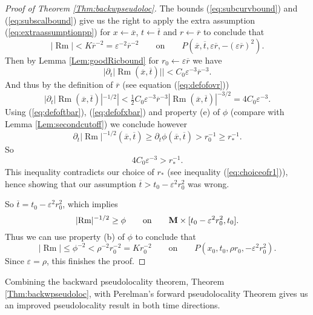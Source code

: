 \documentclass[11pt]{amsart}
\numberwithin{equation}{section}
\def\M{{\bf M}}
\DeclareMathOperator{\Rm}{Rm}
\numberwithin{equation}{section}
\begin{document}
\begin{proof}[Proof of Theorem \ref{Thm:backwpseudoloc}]
The bounds (\ref{eq:subcurvbound}) and (\ref{eq:subscalbound}) give us the right to apply the extra assumption (\ref{eq:extraassumptionpp}) for $x \leftarrow \overline{x}$, $t \leftarrow \overline{t}$ and $r \leftarrow \overline{r}$ to conclude that
\[ |{\Rm}| < K \overline{r}^{-2} = \varepsilon^{-2} \overline{r}^{-2} \qquad \text{on} \qquad P(\overline{x}, \overline{t}, \varepsilon \overline{r}, - (\varepsilon \overline{r})^2). \]
Then by Lemma \ref{Lem:goodRicbound} for $r_0 \leftarrow \varepsilon \overline{r}$ we have
\[ |\partial_t | {\Rm (\overline{x}, \overline{t})}| | < C_0 \varepsilon^{-3} \overline{r}^{-3}. \]
And thus by the definition of $\overline{r}$ (see equation (\ref{eq:defofovr}))
\[ |\partial_t |{\Rm (\overline{x}, \overline{t})}|^{-1/2} | < \tfrac12 C_0 \varepsilon^{-3} \overline{r}^{-3} |{\Rm (\overline{x}, \overline{t} )}|^{-3/2} = 4 C_0 \varepsilon^{-3} .  \]
Using (\ref{eq:defoftbar}), (\ref{eq:defofxbar}) and property (e) of $\phi$ (compare with Lemma \ref{Lem:secondcutoff}) we conclude however
\[ \partial_t |{\Rm}|^{-1/2} (\overline{x}, \overline{t} ) \geq \partial_t \phi (\overline{x}, \overline{t}) >  r_0^{-1} \geq r_*^{-1}. \]
So
\[ 4 C_0 \varepsilon^{-3} >  r_*^{-1} . \]
This inequality contradicts our choice of $r_*$ (see inequality (\ref{eq:choiceofr1})), hence showing that our assumption $\overline{t} > t_0 -  \varepsilon^2 r_0^2$ was wrong.

So $\overline{t} = t_0 -  \varepsilon^2 r_0^2$, which implies
\[ |{\Rm}|^{-1/2} \geq \phi \qquad \text{on} \qquad \M \times [t_0 - \varepsilon^2 r_0^2, t_0]. \]
Thus we can use property (b) of $\phi$ to conclude that
\[ |{\Rm}| \leq \phi^{-2} < \rho^{-2}  r_0^{-2} = K r_0^{-2}  \qquad \text{on} \qquad P(x_0, t_0, \rho  r_0, -  \varepsilon^2 r_0^2). \]
Since $\varepsilon = \rho$, this finishes the proof.
\end{proof}

Combining the backward pseudolocality theorem, Theorem \ref{Thm:backwpseudoloc}, with Perelman's forward pseudolocality Theorem gives us an improved pseudolocality result in both time directions.
\end{document}
